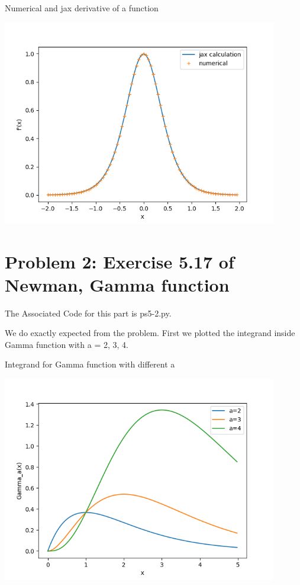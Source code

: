 \documentclass[letterpaper,12pt]{article}
\begin{document}
\begin{table}[!h]
    \centering
    \caption{Numerical and jax derivative of a function}
    \includegraphics[width=12cm]{ps5-1-2.png}
\end{table}%

\section{Problem 2: Exercise 5.17 of Newman, Gamma function}

The Associated Code for this part is ps5-2.py.

We do exactly expected from the problem. First we plotted the integrand inside Gamma function with a = 2, 3, 4.

\begin{table}[!h]
    \centering
    \caption{Integrand for Gamma function with different a}
    \includegraphics[width=12cm]{ps5-2-1.png}
\end{table}%
\end{document}
